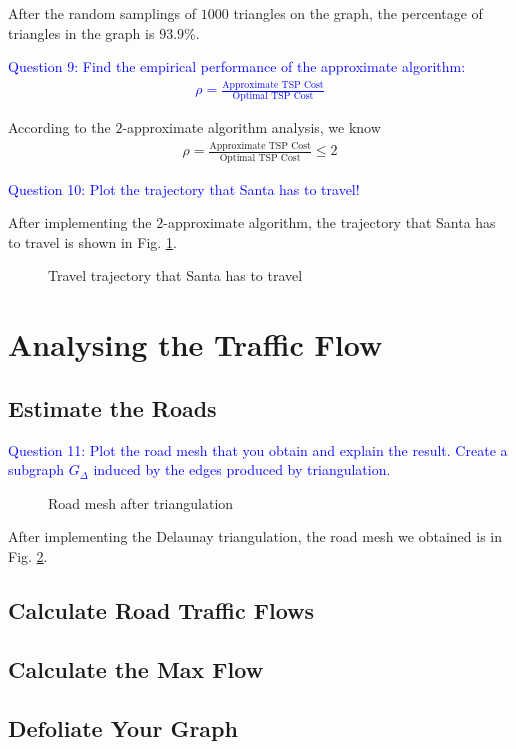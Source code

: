 \documentclass[11pt]{article}
\makeatletter
\def\maxwidth{\ifdim\Gin@nat@width>\linewidth\linewidth
    \else\Gin@nat@width\fi}
\let\Oldincludegraphics\includegraphics
\renewcommand{\includegraphics}[1]{\Oldincludegraphics[width=.8\maxwidth]{#1}}
\makeatother
\begin{document}
After the random samplings of $1000$ triangles on the graph, the percentage of triangles in the graph is $93.9\%$.


\textcolor{blue}{
    Question 9: Find the empirical performance of the approximate algorithm:
    \begin{align}
    \rho=\frac{\text{Approximate TSP Cost}}{\text{Optimal TSP Cost}}
    \end{align}
}

According to the $2$-approximate algorithm analysis, we know
\begin{align}
\rho=\frac{\text{Approximate TSP Cost}}{\text{Optimal TSP Cost}}\le 2
\end{align}


\textcolor{blue}{
    Question 10: Plot the trajectory that Santa has to travel!
}

After implementing the $2$-approximate algorithm, the trajectory that Santa has to travel is shown in Fig. \ref{fig:tour}.


\begin{figure}[t]
\centering
{}
\caption{Travel trajectory that Santa has to travel}
\label{fig:tour}
\end{figure}





\section{Analysing the Traffic Flow}

\subsection{Estimate the Roads}
\textcolor{blue}{
    Question 11: Plot the road mesh that you obtain and explain the result.
Create a subgraph $G_{\Delta}$ induced by the edges produced by triangulation.
}
\begin{figure}[t]
\centering
{}
\caption{Road mesh after triangulation}
\label{fig:road_mesh}
\end{figure}

After implementing the Delaunay triangulation, the road mesh we obtained is in Fig. \ref{fig:road_mesh}.



\subsection{Calculate Road Traffic Flows}

\subsection{Calculate the Max Flow}

\subsection{Defoliate Your Graph}
\end{document}
